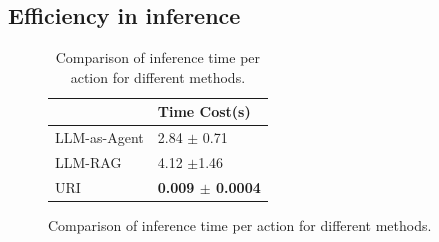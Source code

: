 

\vspace{-1mm}
\subsection{Efficiency in inference}



\begin{figure}
\centering
\vspace{-1cm}
\begin{minipage}{0.41\textwidth}
\begin{table}[H]
\caption{Comparison of inference time per action for different methods.}
\centering
\begin{tabular}{ll}
\hline
           & Time Cost(s)
                  \\ \hline


LLM-as-Agent  & 2.84 $\pm$ 0.71  \\

LLM-RAG & 4.12 $\pm$1.46 \\

URI & \textbf{0.009 $\pm$ 0.0004} \\
\hline
\end{tabular}
\vspace{-2cm}
\label{tab:inference_time}
\end{table}
\end{minipage}
\end{figure}

